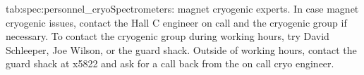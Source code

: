 \begin{namestab}{tab:spec:personnel_cryo}{Spectrometers: magnet cryogenic experts.}{%
    In case magnet cryogenic issues, contact the Hall C
    engineer on call and the cryogenic group if necessary.
    To contact the cryogenic group during working hours, try
    David Schleeper, Joe Wilson, or the guard shack.  Outside of working hours, contact
    the guard shack at x5822 and ask for a call back from the on call cryo engineer.}
  \EngonCall{}
  \CryoonCall{}
\end{namestab}


%
%
